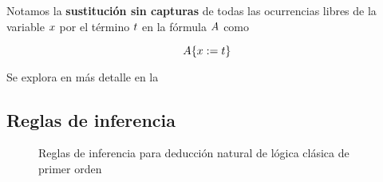 \begin{definition}[Sustitución]
    Notamos la \textbf{sustitución sin capturas} de todas las ocurrencias libres de la variable $x$ por el término $t$ en la fórmula $A$ como

    \[
        A \{x := t\}
    \]

    Se explora en más detalle en la 
\end{definition}

\subsection{Reglas de inferencia}

\begin{figure}[H]
    \begin{multicols}{2}
        \proofTreeFalseE
        \proofTreeTrueI
    \end{multicols}
    
    \begin{multicols}{2}
        \proofTreeLEM
        \proofTreeAx
    \end{multicols}

    \proofSpacing

    \proofTreeAndI

    \begin{multicols}{2}
        \proofTreeAndEOne
        \proofTreeAndETwo
    \end{multicols}

    \proofSpacing

    \begin{multicols}{2}
        \proofTreeOrIOne
        \proofTreeOrITwo
    \end{multicols}
    
    \proofTreeOrE

    \proofSpacing

    \begin{multicols}{2}
        \proofTreeImpI
        \proofTreeImpE
    \end{multicols}
    \begin{multicols}{2}
        \proofTreeNotI
        \proofTreeNotE
    \end{multicols}

    \proofSpacing

    \begin{multicols}{2}
        \proofTreeForallI
        \proofTreeForallE
    \end{multicols}

    \proofSpacing

    \proofTreeExistsI
    \proofTreeExistsE

    \caption{Reglas de inferencia para deducción natural de lógica clásica de primer orden}
    \label{nd:inference-rules}
\end{figure}

